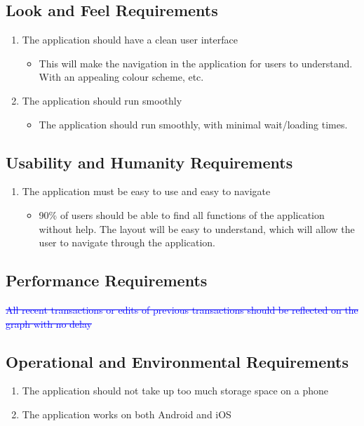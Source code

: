 \documentclass[12pt, titlepage]{article}
\newcounter{lfreq}
\newcommand{\lfthelfreq}{LF\thelfreq}
\newcounter{uhreq}
\newcommand{\uhtheuhreq}{UH\theuhreq}
\newcounter{oereq}
\newcommand{\oetheoereq}{OE\theoereq}
\begin{document}
\subsection{Look and Feel Requirements}
   \begin{enumerate}
   \item [\refstepcounter{lfreq} \lfthelfreq:] The application should have a clean user interface
   \begin{itemize}
     \item This will make the navigation in the application for users to understand. With an appealing colour scheme, etc.
   \end{itemize}

   \item [\refstepcounter{lfreq} \lfthelfreq:]The application should run smoothly
   \begin{itemize}
     \item The application should run smoothly, with minimal wait/loading times. 
   \end{itemize}
\end{enumerate}
\subsection{Usability and Humanity Requirements}
   \begin{enumerate}
   \item[\refstepcounter{uhreq} \uhtheuhreq:]  The application must be easy to use and easy to navigate
   \begin{itemize}
     \item 90\% of users should be able to find all functions of the application without help. The layout will be easy to understand, which will allow the user to navigate through the application.
   \end{itemize}
 \end{enumerate}
\subsection{Performance Requirements}
\textcolor{blue}{\st{All recent transactions or edits of previous transactions should be reflected on the graph with no delay}}

\subsection{Operational and Environmental Requirements}
   \begin{enumerate}
     \item [\refstepcounter{oereq} \oetheoereq:]  The application should not take up too much storage space on a phone
     \item  [\refstepcounter{oereq} \oetheoereq:] The application works on both Android and iOS
   \end{enumerate}
\end{document}
